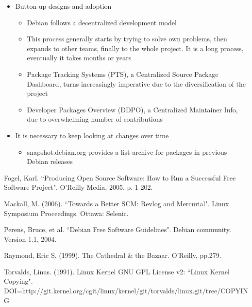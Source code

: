\documentclass[11pt]{article} %
\begin{document}
\begin{itemize}
\begin{itemize}
	  	\end{itemize}
  	  \item Button-up designs and adoption
	  	\begin{itemize}
	  	  \item Debian follows a decentralized development model
	  	  \item This process generally starts by trying to solve own problems, then expands to other teams, finally to the whole project. It is a long process, eventually it takes months or years
	  	  \item Package Tracking Systems (PTS), a Centralized Source Package Dashboard, turns increasingly imperative due to the diversification of the project
	  	  \item Developer Packages Overview (DDPO), a Centralized Maintainer Info, due to overwhelming number of contributions
	  	\end{itemize}  	  
  	  \item It is necessary to keep looking at changes over time
	  	\begin{itemize}
	  	  \item snapshot.debian.org provides a list archive for packages in previous Debian releases
	  	\end{itemize}
  	\end{itemize}

\pagebreak


\begin{thebibliography}{99}


Fogel, Karl.
\newblock ``Producing Open Source Software: How to Run a Successful Free Software Project".
\newblock O'Reilly Media, 2005. p. 1-202.

Mackall, M. (2006).
\newblock ``Towards a Better SCM: Revlog and Mercurial".
\newblock Linux Symposium Proceedings. Ottawa: Selenic.

Perens, Bruce, et al.
\newblock ``Debian Free Software Guidelines".
\newblock Debian community. Version 1.1, 2004.

Raymond, Eric S. (1999).
\newblock The Cathedral \& the Bazaar.
\newblock O'Reilly, pp.279.

Torvalds, Linus. (1991).
\newblock Linux Kernel GNU GPL License v2:  ``Linux Kernel Copying".\\
\newblock DOI=http://git.kernel.org/cgit/linux/kernel/git/torvalds/linux.git/tree/COPYING
 
\end{thebibliography}

\end{document}

